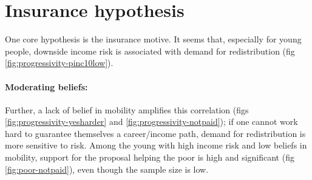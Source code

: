 \documentclass{article}
\begin{document}

\section*{Insurance hypothesis}

One core hypothesis is the insurance motive. It seems that, especially for young people, downside income risk is associated with demand for redistribution (fig \ref{fig:progressivity-pinc10low}). 

\paragraph{Moderating beliefs:} Further, a lack of belief in mobility amplifies this correlation (figs \ref{fig:progressivity-yesharder} and \ref{fig:progressivity-notpaid}); if one cannot work hard to guarantee themselves a career/income path, demand for redistribution is more sensitive to risk. Among the young with high income risk and low beliefs in mobility, support for the proposal helping the poor is high and significant (fig \ref{fig:poor-notpaid}), even though the sample size is low.
\end{document}
